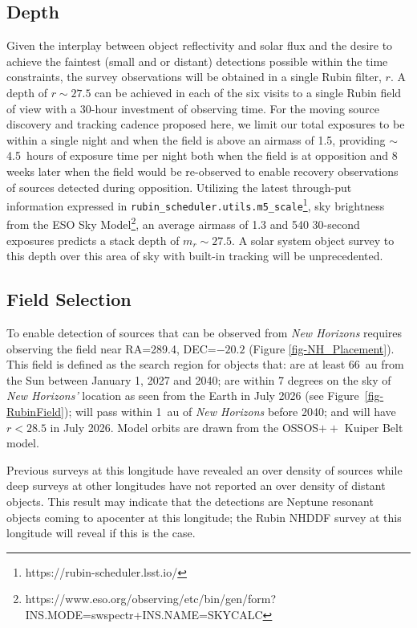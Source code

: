 \documentclass[modern,linenumbers,trackchanges,preprint]{aastex631}
\begin{document}
\subsection{Depth}
Given the interplay between object reflectivity and solar flux and the desire to achieve the faintest (small and or distant) detections possible within the time constraints, the survey observations will be obtained in a single Rubin filter, $r$.
A depth of $r\sim 27.5$ can be achieved in each of the six visits to a single Rubin field of view with a 30-hour investment of observing time.
For the moving source discovery and tracking cadence proposed here, we limit our total exposures to be within a single night and when the field is above an airmass of 1.5, providing $\sim$4.5~hours of exposure time per night both when the field is at opposition and 8 weeks later when the field would be re-observed to enable recovery observations of sources detected during opposition.
Utilizing the latest through-put information expressed in \texttt{rubin\_scheduler.utils.m5\_scale}\footnote{https://rubin-scheduler.lsst.io/}, sky brightness from the ESO Sky Model\footnote{https://www.eso.org/observing/etc/bin/gen/form?INS.MODE=swspectr+INS.NAME=SKYCALC}, an average airmass of 1.3 and 540 30-second exposures predicts a stack depth of $m_r \sim 27.5$.
A solar system object survey to this depth over this area of sky with built-in tracking will be unprecedented.

\subsection{Field Selection}
To enable detection of sources that can be observed from {\it New Horizons} requires observing the field near RA=289.4, DEC=$-20.2$ (Figure \ref{fig-NH_Placement}). 
This field is defined as the search region for objects that: are at least 66~au from the Sun between January 1, 2027 and 2040; are within 7 degrees on the sky of {\it New Horizons'} location as seen from the Earth in July 2026 (see Figure~\ref{fig-RubinField}); will pass within 1~au of {\it New Horizons} before 2040; and will have $r <28.5$ in July 2026. 
Model orbits are drawn from the OSSOS$++$ Kuiper Belt model. 

Previous surveys at this longitude have revealed an over density of sources while deep surveys at other longitudes \citep[e.g.][]{Napier2023} have not reported an over density of distant objects. This result may indicate that the \citet{Fraser2024PSJ} detections are Neptune resonant objects coming to apocenter at this longitude; the Rubin NHDDF survey at this longitude will reveal if this is the case.
\end{document}
